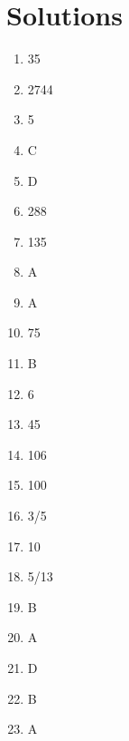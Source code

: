 \documentclass[../satmath.tex]{subfiles}
\begin{document}
\section*{Solutions}
\begin{enumerate}[label=\bfseries\arabic*.]

\item 35
\item 2744
\item 5
\item C
\item D
\item 288
\item 135
\item A
\item A
\item 75
\item B
\item 6
\item 45
\item 106
\item 100
\item 3/5
\item 10
\item 5/13
\item B
\item A
\item D
\item B
\item A
\end{enumerate}
\end{document}
